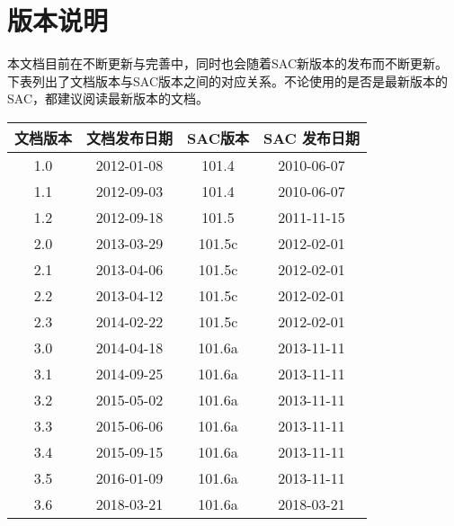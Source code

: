 {\section*{版本说明}}

本文档目前在不断更新与完善中，同时也会随着SAC新版本的发布而不断更新。
下表列出了文档版本与SAC版本之间的对应关系。不论使用的是否是最新版本的
SAC，都建议阅读最新版本的文档。

\begin{table}[H]
\centering
\begin{tabular}{cccc}
\toprule
文档版本    &   文档发布日期    &   SAC版本 &   SAC 发布日期\\
\midrule
1.0         &   2012-01-08      &   101.4   &   2010-06-07  \\
1.1         &   2012-09-03      &   101.4   &   2010-06-07  \\
1.2         &   2012-09-18      &   101.5   &   2011-11-15  \\
2.0         &   2013-03-29      &   101.5c  &   2012-02-01  \\
2.1         &   2013-04-06      &   101.5c  &   2012-02-01  \\
2.2         &   2013-04-12      &   101.5c  &   2012-02-01  \\
2.3         &   2014-02-22      &   101.5c  &   2012-02-01  \\
3.0         &   2014-04-18      &   101.6a  &   2013-11-11  \\
3.1         &   2014-09-25      &   101.6a  &   2013-11-11  \\
3.2         &   2015-05-02      &   101.6a  &   2013-11-11  \\
3.3         &   2015-06-06      &   101.6a  &   2013-11-11  \\
3.4         &   2015-09-15      &   101.6a  &   2013-11-11  \\
3.5         &   2016-01-09      &   101.6a  &   2013-11-11  \\
3.6         &   2018-03-21      &   101.6a  &   2018-03-21  \\
\bottomrule
\end{tabular}
\end{table}
